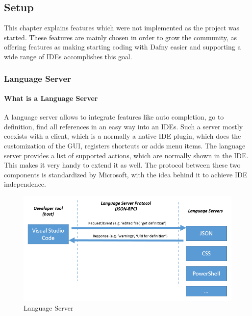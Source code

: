 \subsection{Setup}\label{setup}
This chapter explains features which were not implemented as the project was started. These features are mainly chosen in order to grow the community, as offering features as making starting coding with Dafny easier and supporting a wide range of IDEs accomplishes this goal.
\subsubsection{Language Server} \label{setupLanguageServer}
\paragraph{What is a Language Server}
A language server allows to integrate features like auto completion, go to definition, find all references in an easy way into an IDEs. Such a server mostly coexists with a client, which is a normally a native IDE plugin, which does the customization of the GUI, registers shortcuts or adds menu items. The language server provides a list of supported actions, which are normally shown in the IDE. This makes it very handy to extend it as well. 
The protocol between these two components is standardized by Microsoft, with the idea behind it to achieve IDE independence. 
 \newline
\begin{figure}[H]
	\centering
	\includegraphics[width=1.0\textwidth]{img/languageServer}
	\caption{Language Server}
	\label{fig:languageServer}
\end{figure}
